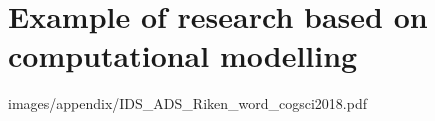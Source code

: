 \chapter{Example of research based on computational modelling}

{images/appendix/IDS_ADS_Riken_word_cogsci2018.pdf}


